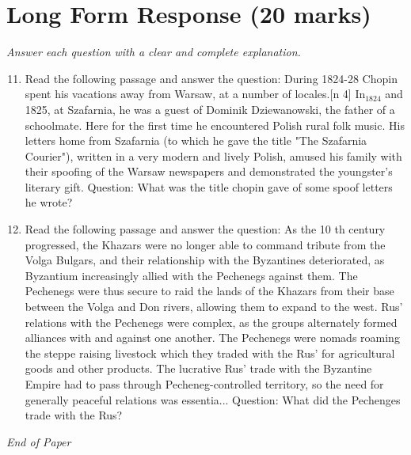 \documentclass[12pt]{article}
\begin{document}
\section*{Long Form Response (20 marks)}
\textit{Answer each question with a clear and complete explanation.}
\begin{enumerate}[label=\arabic*.]
\setcounter{enumi}{10}
\item Read the following passage and answer the question: During 1824-28 Chopin spent his vacations away from Warsaw, at a number of locales.[n 4] In$_{1824}$ and 1825, at Szafarnia, he was a guest of Dominik Dziewanowski, the father of a schoolmate. Here for the first time he encountered Polish rural folk music. His letters home from Szafarnia (to which he gave the title "The Szafarnia Courier"), written in a very modern and lively Polish, amused his family with their spoofing of the Warsaw newspapers and demonstrated the youngster's literary gift. Question: What was the title chopin gave of some spoof letters he wrote?
\item Read the following passage and answer the question: As the 10 th century progressed, the Khazars were no longer able to command tribute from the Volga Bulgars, and their relationship with the Byzantines deteriorated, as Byzantium increasingly allied with the Pechenegs against them. The Pechenegs were thus secure to raid the lands of the Khazars from their base between the Volga and Don rivers, allowing them to expand to the west. Rus' relations with the Pechenegs were complex, as the groups alternately formed alliances with and against one another. The Pechenegs were nomads roaming the steppe raising livestock which they traded with the Rus' for agricultural goods and other products. The lucrative Rus' trade with the Byzantine Empire had to pass through Pecheneg-controlled territory, so the need for generally peaceful relations was essentia... Question: What did the Pechenges trade with the Rus?
\end{enumerate}

\vfill
\noindent\textit{End of Paper}
\end{document}
